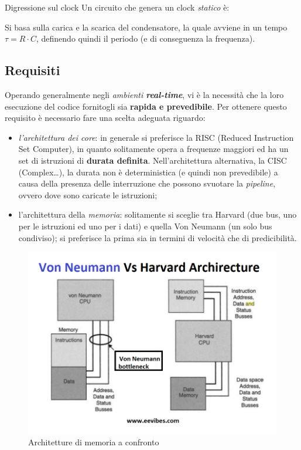 \documentclass[
]{book}
\providecommand{\tightlist}{%
  \setlength{\itemsep}{0pt}\setlength{\parskip}{0pt}}
\begin{document}
\begin{redbox}{Digressione sul clock}
Un circuito che genera un clock \emph{statico} è:
\begin{center}
\begin{minipage}{0.6\linewidth}
\centering
\resizebox{0.6\textwidth}{!}{%
}
\end{minipage}
\end{center}
Si basa sulla carica e la scarica del condensatore, la quale avviene in un tempo $\tau=R\cdot C$, definendo quindi il periodo (e di conseguenza la frequenza).
\end{redbox}

\subsection{Requisiti}\label{requisiti}

Operando generalmente negli \emph{ambienti \textbf{real-time}}, vi è la
necessità che la loro esecuzione del codice fornitogli sia
\textbf{rapida e prevedibile}. Per ottenere questo requisito è
necessario fare una scelta adeguata riguardo:

\begin{itemize}
\tightlist
\item
  \emph{l'architettura dei core}: in generale si preferisce la RISC
  (Reduced Instruction Set Computer), in quanto solitamente opera a
  frequenze maggiori ed ha un set di istruzioni di \textbf{durata
  definita}. Nell'architettura alternativa, la CISC (Complex\ldots), la
  durata non è deterministica (e quindi non prevedibile) a causa della
  presenza delle interruzione che possono svuotare la \emph{pipeline},
  ovvero dove sono caricate le istruzioni;
\item
  l'architettura della \emph{memoria}: solitamente si sceglie tra
  Harvard (due bus, uno per le istruzioni ed uno per i dati) e quella
  Von Neumann (un solo bus condiviso); si preferisce la prima sia in
  termini di velocità che di predicibilità.
\end{itemize}

\begin{figure}
\centering
\includegraphics[width=0.4\linewidth,height=\textheight,keepaspectratio]{immagini/48.png}
\caption{Architetture di memoria a confronto}
\end{figure}
\end{document}
